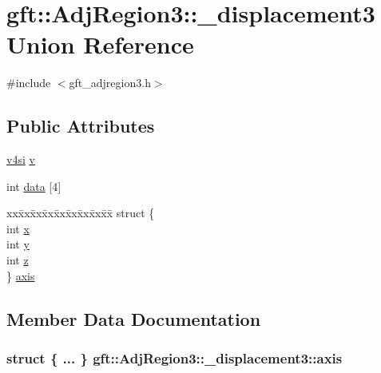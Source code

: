 \hypertarget{uniongft_1_1AdjRegion3_1_1__displacement3}{}\section{gft\+:\+:Adj\+Region3\+:\+:\+\_\+displacement3 Union Reference}
\label{uniongft_1_1AdjRegion3_1_1__displacement3}


{\ttfamily \#include $<$gft\+\_\+adjregion3.\+h$>$}

\subsection*{Public Attributes}
\begin{DoxyCompactItemize}
\item 
\hyperlink{namespacegft_aba3889d81ba015326f093206316745b7}{v4si} \hyperlink{uniongft_1_1AdjRegion3_1_1__displacement3_a29fc6fe36e0937fd715c0f394f1e8e87}{v}
\item 
int \hyperlink{uniongft_1_1AdjRegion3_1_1__displacement3_ae2fabfae5afcbee10f5d7f0f8bf4b40c}{data} \mbox{[}4\mbox{]}
\item 
\begin{tabbing}
xx\=xx\=xx\=xx\=xx\=xx\=xx\=xx\=xx\=\kill
struct \{\\
\>int \hyperlink{uniongft_1_1AdjRegion3_1_1__displacement3_a3d9a90de02004c91413b6dccdce2af03}{x}\\
\>int \hyperlink{uniongft_1_1AdjRegion3_1_1__displacement3_ae5f88f74ade7acc6cc97a8ba8537a8c8}{y}\\
\>int \hyperlink{uniongft_1_1AdjRegion3_1_1__displacement3_a05b4db47be0e60b35bf377f9af225edf}{z}\\
\} \hyperlink{uniongft_1_1AdjRegion3_1_1__displacement3_a0e0bf1a65fe30a11c45436c8e23a025d}{axis}\\

\end{tabbing}\end{DoxyCompactItemize}


\subsection{Member Data Documentation}
\subsubsection[{\texorpdfstring{axis}{axis}}]{\setlength{\rightskip}{0pt plus 5cm}struct \{ ... \}   gft\+::\+Adj\+Region3\+::\+\_\+displacement3\+::axis}\hypertarget{uniongft_1_1AdjRegion3_1_1__displacement3_a0e0bf1a65fe30a11c45436c8e23a025d}{}\label{uniongft_1_1AdjRegion3_1_1__displacement3_a0e0bf1a65fe30a11c45436c8e23a025d}
